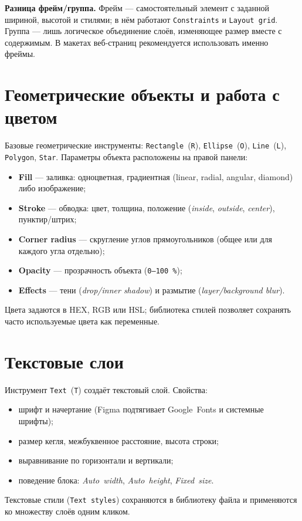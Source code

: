 \textbf{Разница фрейм/группа.} Фрейм — самостоятельный элемент с заданной
шириной, высотой и стилями; в нём работают \texttt{Constraints} и
\texttt{Layout grid}. Группа — лишь логическое объединение слоёв,
изменяющее размер вместе с содержимым. В макетах веб-страниц
рекомендуется использовать именно фреймы.

\section{Геометрические объекты и работа с цветом}

Базовые геометрические инструменты: \texttt{Rectangle}~(\texttt{R}),
\texttt{Ellipse}~(\texttt{O}), \texttt{Line}~(\texttt{L}),
\texttt{Polygon}, \texttt{Star}. Параметры объекта расположены на правой
панели:
\begin{itemize}
  \item \textbf{Fill} — заливка: одноцветная, градиентная (linear,
        radial, angular, diamond) либо изображение;
  \item \textbf{Stroke} — обводка: цвет, толщина, положение
        (\textit{inside}, \textit{outside}, \textit{center}),
        пунктир/штрих;
  \item \textbf{Corner radius} — скругление углов прямоугольников
        (общее или для каждого угла отдельно);
  \item \textbf{Opacity} — прозрачность объекта (\texttt{0--100\,\%});
  \item \textbf{Effects} — тени (\textit{drop/inner shadow}) и размытие
        (\textit{layer/background blur}).
\end{itemize}
Цвета задаются в HEX, RGB или HSL; библиотека стилей позволяет сохранять
часто используемые цвета как переменные.

\section{Текстовые слои}

Инструмент \texttt{Text}~(\texttt{T}) создаёт текстовый слой. Свойства:
\begin{itemize}
  \item шрифт и начертание (Figma подтягивает Google~Fonts и системные
        шрифты);
  \item размер кегля, межбуквенное расстояние, высота строки;
  \item выравнивание по горизонтали и вертикали;
  \item поведение блока: \textit{Auto~width}, \textit{Auto~height},
        \textit{Fixed~size}.
\end{itemize}
Текстовые стили (\texttt{Text styles}) сохраняются в библиотеку файла
и применяются ко множеству слоёв одним кликом.

